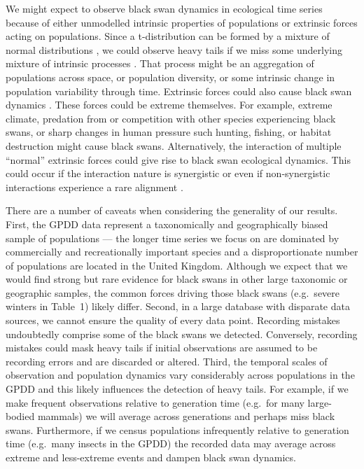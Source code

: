 We might expect to observe black swan dynamics in ecological time series
because of either unmodelled intrinsic properties of populations or extrinsic
forces acting on populations. Since a t-distribution can be formed by a mixture
of normal distributions \citep{gelman2014}, we could observe heavy tails if we
miss some underlying mixture of intrinsic processes \citep{allen2001}. That
process might be an aggregation of populations across space, or population
diversity, or some intrinsic change in population variability through time.
Extrinsic forces could also cause black swan dynamics
\citep[e.g.][]{nunez2012}. These forces could be extreme themselves. For
example, extreme climate, predation from or competition with other species
experiencing black swans, or sharp changes in human pressure such hunting,
fishing, or habitat destruction might cause black swans. Alternatively, the
interaction of multiple ``normal'' extrinsic forces could give rise to black
swan ecological dynamics. This could occur if the interaction nature is
synergistic \citep[e.g.][]{kirby2009} or even if non-synergistic interactions
experience a rare alignment \citep{denny2009}.

There are a number of caveats when considering the generality of our results.
First, the GPDD data represent a taxonomically and geographically biased sample
of populations --- the longer time series we focus on are dominated by
commercially and recreationally important species and a disproportionate number
of populations are located in the United Kingdom. Although we expect that we
would find strong but rare evidence for black swans in other large taxonomic or
geographic samples, the common forces driving those black swans (e.g.~severe
winters in Table~1) likely differ. Second, in a large database with disparate
data sources, we cannot ensure the quality of every data point. Recording
mistakes undoubtedly comprise some of the black swans we detected. Conversely,
recording mistakes could mask heavy tails if initial observations are assumed
to be recording errors and are discarded or altered. Third, the temporal scales
of observation and population dynamics vary considerably across populations in
the GPDD and this likely influences the detection of heavy tails. For example,
if we make frequent observations relative to generation time (e.g.~for many
large-bodied mammals) we will average across generations and perhaps miss
black swans. Furthermore, if we census populations infrequently relative to
generation time (e.g.~many insects in the GPDD) the recorded data may average
across extreme and less-extreme events and dampen black swan dynamics.

